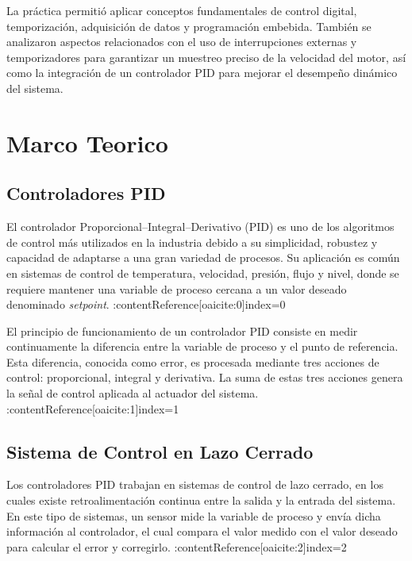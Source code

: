 \documentclass[journal, onecolumn]{IEEEtran}
\begin{document}
La práctica permitió aplicar conceptos fundamentales de control digital, temporización, adquisición de datos y programación embebida. También se analizaron aspectos relacionados con el uso de interrupciones externas y temporizadores para garantizar un muestreo preciso de la velocidad del motor, así como la integración de un controlador PID para mejorar el desempeño dinámico del sistema.

\section{Marco Teorico}

\subsection{Controladores PID}

El controlador Proporcional–Integral–Derivativo (PID) es uno de los algoritmos de control más utilizados en la industria debido a su simplicidad, robustez y capacidad de adaptarse a una gran variedad de procesos. Su aplicación es común en sistemas de control de temperatura, velocidad, presión, flujo y nivel, donde se requiere mantener una variable de proceso cercana a un valor deseado denominado \textit{setpoint}. :contentReference[oaicite:0]{index=0}

El principio de funcionamiento de un controlador PID consiste en medir continuamente la diferencia entre la variable de proceso y el punto de referencia. Esta diferencia, conocida como error, es procesada mediante tres acciones de control: proporcional, integral y derivativa. La suma de estas tres acciones genera la señal de control aplicada al actuador del sistema. :contentReference[oaicite:1]{index=1}

\subsection{Sistema de Control en Lazo Cerrado}

Los controladores PID trabajan en sistemas de control de lazo cerrado, en los cuales existe retroalimentación continua entre la salida y la entrada del sistema. En este tipo de sistemas, un sensor mide la variable de proceso y envía dicha información al controlador, el cual compara el valor medido con el valor deseado para calcular el error y corregirlo. :contentReference[oaicite:2]{index=2}
\end{document}
